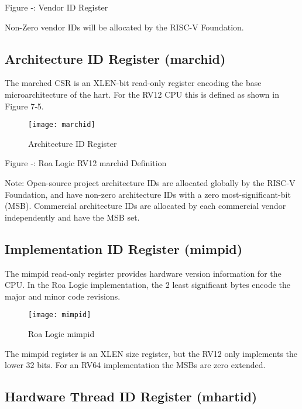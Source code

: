 Figure ‑: Vendor ID Register

Non-Zero vendor IDs will be allocated by the RISC-V Foundation.

\subsection{Architecture ID Register
(marchid)}\label{architecture-id-register-marchid}

The marched CSR is an XLEN-bit read-only register encoding the base
microarchitecture of the hart. For the RV12 CPU this is defined as shown
in Figure 7‑5.

\begin{figure}[hbt]
  \texttt{[image: marchid]}
  \caption{Architecture ID Register}
\end{figure}

\protect\hypertarget{_Ref367028846}{}{}Figure ‑: Roa Logic RV12 marchid
Definition

Note: Open-source project architecture IDs are allocated globally by the
RISC-V Foundation, and have non-zero architecture IDs with a zero
most-significant-bit (MSB). Commercial architecture IDs are allocated by
each commercial vendor independently and have the MSB set.

\subsection{Implementation ID Register
(mimpid)}\label{implementation-id-register-mimpid}

The mimpid read-only register provides hardware version information for
the CPU. In the Roa Logic implementation, the 2 least significant bytes
encode the major and minor code revisions.

\begin{figure}[hbt]
  \texttt{[image: mimpid]}
  \caption{Roa Logic mimpid}
\end{figure}

The mimpid register is an XLEN size register, but the RV12 only
implements the lower 32 bits. For an RV64 implementation the MSBs are
zero extended.

\subsection{Hardware Thread ID Register
(mhartid)}\label{hardware-thread-id-register-mhartid}

\missingfigure{}

